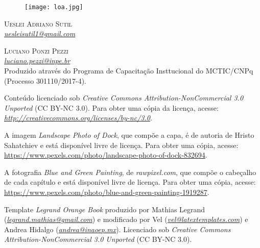 \newpage
\thispagestyle{empty}

\begin{figure}[H]
    \centering
    \vspace*{\fill}
    \texttt{[image: loa.jpg]}
    \vspace{2cm}
\end{figure}


\noindent \textsc{Ueslei Adriano Sutil} 
\\
\noindent \textcolor{bleu_cite}{\href{uesleisutil1@gmail.com}{\textit{uesleisutil1@gmail.com}}}  %
\bigskip

\noindent \textsc{Luciano Ponzi Pezzi}
\\
\noindent \textcolor{bleu_cite}{\href{luciano.pezzi@inpe.br}{\textit{luciano.pezzi@inpe.br}}}  %
\bigskip
\\

\noindent Produzido através do Programa de Capacitação Insttucional do MCTIC/CNPq (Processo 301110/2017-4). 
\bigskip

\noindent Conteúdo licenciado sob \textit{Creative Commons Attribution-NonCommercial 3.0 Unported} (CC BY-NC 3.0).
          Para obter uma cópia da licença, acesse: \textcolor{bleu_cite}{\href{http://creativecommons.org/licenses/by-nc/3.0}{\textit{http://creativecommons.org/licenses/by-nc/3.0}}}. 
\bigskip

\noindent A imagem \textit{Landscape Photo of Dock}, que compõe a capa, é de autoria de Hristo Sahatchiev e está disponível livre de 
          licença. Para obter uma cópia, acesse: \textcolor{bleu_cite}{\href{https://www.pexels.com/photo/landscape-photo-of-dock-832694}{https://www.pexels.com/photo/landscape-photo-of-dock-832694}}. \
\bigskip

\noindent A fotografia \textit{Blue and Green Painting}, de \textit{rawpixel.com}, que compõe o cabeçalho de cada capítulo e
          está disponível livre de licença. Para obter uma cópia, acesse: \textcolor{bleu_cite}{\href{https://www.pexels.com/photo/blue-and-green-painting-1919287}{https://www.pexels.com/photo/blue-and-green-painting-1919287}}.  \\
\bigskip

\noindent Template \textit{Legrand Orange Book} produzido por Mathias Legrand 
          (\textcolor{bleu_cite}{\href{legrand.mathias@gmail.com}{\textit{legrand.mathias@gmail.com}}}) e modificado por 
          Vel (\textcolor{bleu_cite}{\href{vel@latextemplates.com}{\textit{vel@latextemplates.com}}}) e Andrea Hidalgo (\textcolor{bleu_cite}{\href{andrea@inaoep.mx}{\textit{andrea@inaoep.mx}}}). Licenciado sob \textit{Creative Commons Attribution-NonCommercial 3.0 Unported} (CC BY-NC 3.0).\\
\bigskip

